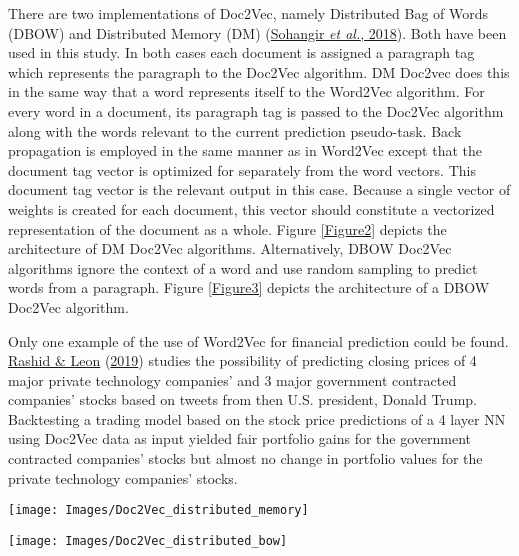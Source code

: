 \documentclass[11pt,preprint, authoryear]{elsarticle}
\let\origfigure\figure
\let\endorigfigure\endfigure
\renewenvironment{figure}[1][2] {
    \expandafter\origfigure\expandafter[H]
} {
    \endorigfigure
}
\numberwithin{equation}{section}
\numberwithin{figure}{section}
\numberwithin{table}{section}
\begin{document}
There are two implementations of Doc2Vec, namely Distributed Bag of
Words (DBOW) and Distributed Memory (DM)
(\protect\hyperlink{ref-sohangir2018financial}{Sohangir \emph{et al.},
2018}). Both have been used in this study. In both cases each document
is assigned a paragraph tag which represents the paragraph to the
Doc2Vec algorithm. DM Doc2vec does this in the same way that a word
represents itself to the Word2Vec algorithm. For every word in a
document, its paragraph tag is passed to the Doc2Vec algorithm along
with the words relevant to the current prediction pseudo-task. Back
propagation is employed in the same manner as in Word2Vec except that
the document tag vector is optimized for separately from the word
vectors. This document tag vector is the relevant output in this case.
Because a single vector of weights is created for each document, this
vector should constitute a vectorized representation of the document as
a whole. Figure \ref{Figure2} depicts the architecture of DM Doc2Vec
algorithms. Alternatively, DBOW Doc2Vec algorithms ignore the context of
a word and use random sampling to predict words from a paragraph. Figure
\ref{Figure3} depicts the architecture of a DBOW Doc2Vec algorithm.

Only one example of the use of Word2Vec for financial prediction could
be found. \protect\hyperlink{ref-rashid2019making}{Rashid \& Leon}
(\protect\hyperlink{ref-rashid2019making}{2019}) studies the possibility
of predicting closing prices of 4 major private technology companies'
and 3 major government contracted companies' stocks based on tweets from
then U.S. president, Donald Trump. Backtesting a trading model based on
the stock price predictions of a 4 layer NN using Doc2Vec data as input
yielded fair portfolio gains for the government contracted companies'
stocks but almost no change in portfolio values for the private
technology companies' stocks.

\begin{figure}[H]

{\centering \texttt{[image: Images/Doc2Vec\_distributed\_memory]} 

}

\caption{Doc2Vec model - distributed memory architecture: dm = 1 \label{Figure2}}\label{fig:Doc2Vec DM}
\end{figure}

\begin{figure}[H]

{\centering \texttt{[image: Images/Doc2Vec\_distributed\_bow]} 

}

\caption{Doc2Vec model - distributed bag of words architecture: dm = 0 \label{Figure3}}\label{fig:Doc2Vec DBOW}
\end{figure}
\end{document}
